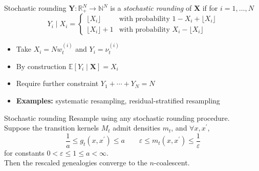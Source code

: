 \documentclass[aspectratio=169]{beamer}
\theoremstyle{definition}
\newcommand{\E}{\mathbb{E}}
\newcommand{\vt}[2][t]{\nu_{#1}^{(#2)}}
\newcommand{\wt}[2][t]{w_{#1}^{(#2)}}
\begin{document}
\begin{frame}{Stochastic rounding}
$\mathbf{Y}: \mathbb{R}_+^N \to \mathbb{N}^N$ is a \emph{stochastic rounding} of $\mathbf{X}$ if for $i=1,\dots,N$
\begin{equation*}
Y_i \mid X_i =
\begin{cases}
 \lfloor X_i \rfloor & \text{with probability } 1- X_i + \lfloor X_i \rfloor \\
  \lfloor X_i \rfloor +1 & \text{with probability } X_i - \lfloor X_i \rfloor 
\end{cases}
\end{equation*}
\begin{itemize}
\item Take $X_i = N\wt{i}$ and $Y_i = \vt{i}$
\item By construction $\E[Y_i \mid \mathbf{X}] = X_i$
\item Require further constraint $Y_1 + \cdots + Y_N = N$
\item \textbf{Examples:} systematic resampling, residual-stratified resampling
\end{itemize}
\end{frame}


\begin{frame}{Stochastic rounding}
Resample using any stochastic rounding procedure.\\[10pt]
Suppose the transition kernels $M_t$ admit densities $m_t$, and $\forall x, x^\prime$,
\begin{equation*}
\frac{1}{a} \leq g_t(x, x^\prime) \leq a \qquad
\varepsilon \leq m_t(x, x^\prime) \leq \frac{1}{\varepsilon} 
\end{equation*}
for constants $0<\varepsilon\leq 1\leq a<\infty$.\\[10pt]
Then the rescaled genealogies converge to the $n$-coalescent.
\end{frame}
\end{document}
